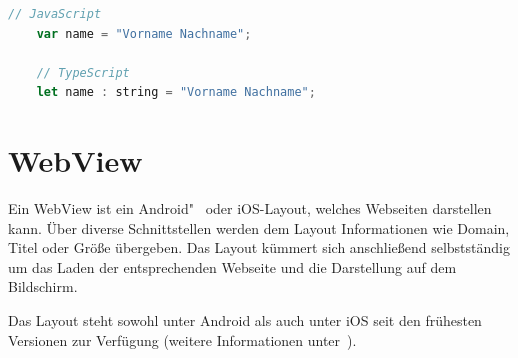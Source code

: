 \begin{lstlisting}[language=JavaScript, caption=Unterschied zwischen JavaScript und TypeScript, label=ls:grundlagen_typescript]
    // JavaScript
    var name = "Vorname Nachname";

    // TypeScript
    let name : string = "Vorname Nachname";
\end{lstlisting}

\section{WebView}
Ein WebView ist ein Android"~ oder iOS-Layout, welches Webseiten darstellen kann. Über diverse Schnittstellen werden dem
Layout Informationen wie Domain, Titel oder Größe übergeben. Das Layout kümmert sich anschließend selbstständig um das
Laden der entsprechenden Webseite und die Darstellung auf dem Bildschirm.

Das Layout steht sowohl unter Android als auch unter iOS seit den frühesten Versionen zur Verfügung (weitere
Informationen unter~\cite{online_grundlagen_webview}).